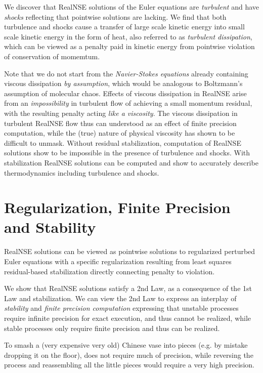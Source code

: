 We discover that RealNSE solutions of the Euler equations  
are \emph{turbulent} and have \emph{shocks} reflecting that
pointwise solutions are lacking.
We find that both turbulence and shocks cause a
transfer of large scale kinetic energy into small scale kinetic
energy in the form of heat, also referred to as 
\emph{turbulent dissipation}, which can be viewed 
as a penalty paid in kinetic energy from pointwise violation 
of conservation of momemtum.  

Note that we do not start from
the \emph{Navier-Stokes equations} already containing viscous
dissipation \emph{by assumption}, which would be analogous to Boltzmann's 
assumption of molecular chaos. Effects of viscous dissipation 
in RealNSE arise from an \emph{impossibility} in turbulent flow
of achieving a small momentum residual, with the resulting penalty 
acting \emph{like a viscosity}. The viscous dissipation in turbulent RealNSE 
flow thus can understood as an effect 
of finite precision computation, while the (true) nature of  
physical viscosity has shown to be difficult to unmask.
Without residual stabilization,
computation of RealNSE solutions show to be impossible 
in the presence of turbulence and shocks. 
With stabilization RealNSE solutions can be computed and show to accurately
describe thermodynamics including turbulence and shocks.
  



\section{Regularization, Finite Precision and Stability}

RealNSE solutions can be viewed as pointwise solutions to
regularized perturbed Euler equations with a specific
regularization resulting from least squares residual-based
stabilization directly connecting penalty to violation.


We show that RealNSE solutions satisfy a 2nd Law, as a consequence
of the 1st Law and stabilization. We can view the 2nd Law to 
express an interplay of \emph{stability} and
\emph{finite precision computation} expressing that unstable processes require
infinite precision for exact execution, and thus cannot be realized,
while stable processes only require finite precision and thus can be realized. 

To smash
a (very expensive very old) Chinese vase into pieces (e.g. by mistake dropping
it on the floor), does not require much of precision, 
while reversing the process and reassembling all the little
pieces would require a very high precision.   

